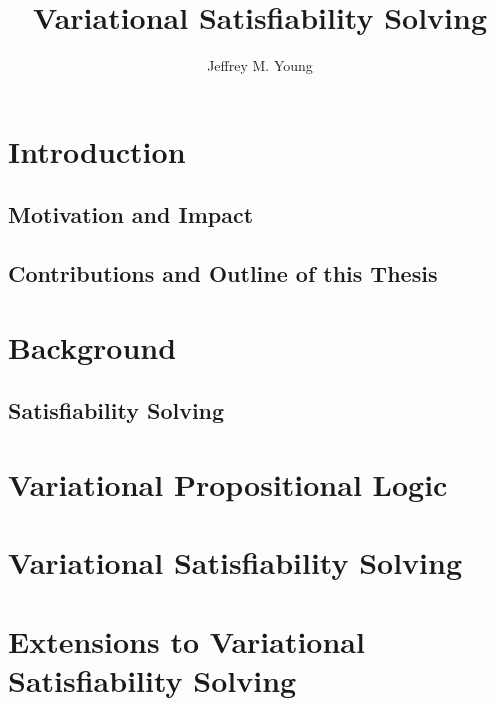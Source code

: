 \documentclass[onehalf,11pt]{beavtex}
\title{Variational Satisfiability Solving}
\author{Jeffrey M. Young}
\begin{document}
\maketitle

\mainmatter{}

\listoftodos{}

\chapter{Introduction}

\section{Motivation and Impact}


\section{Contributions and Outline of this Thesis}

\chapter{Background}

\section{Satisfiability Solving}

\chapter{Variational Propositional Logic}

\chapter{Variational Satisfiability Solving}

\chapter{Extensions to Variational Satisfiability Solving}
\end{document}
